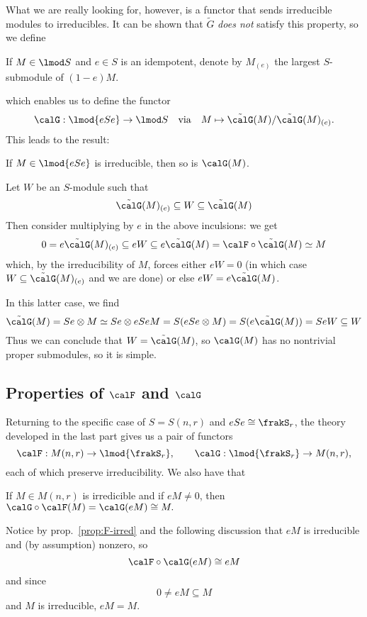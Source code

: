 \documentclass[12pt]{article}
\begin{document}
What we are really looking for, however, is a functor that sends irreducible modules to irreducibles. It can be shown that $\tilde G$ 
\textit{does not} satisfy this property, so we define 
\begin{defn}
	If $M\in\lmod S$ and $e\in S$ is an idempotent, denote by $M_{(e)}$ the largest $S$-submodule of $(1-e)M$.
\end{defn}
\noindent which enables us to define the functor 
\[\calG:\lmod{eSe}\to \lmod S\quad\text{via}\quad M\mapsto \tilde\calG(M)/\tilde\calG(M)_{(e)}.\]
This leads to the result:
\begin{prop}
	If $M\in \lmod{eSe}$ is irreducible, then so is $\calG(M)$.
\end{prop}
\begin{prf}
	Let $W$ be an $S$-module such that 
	\[\tilde\calG(M)_{(e)}\subseteq W\subseteq \tilde\calG(M)\]
	Then consider multiplying by $e$ in the above inculsions:
	we get
	\[0=e\tilde\calG(M)_{(e)}\subseteq eW\subseteq e\tilde \calG(M)=\calF\circ\tilde\calG(M)\simeq M\]
	which, by the irreducibility of $M$, forces either $eW=0$ (in which case $W\subseteq\tilde\calG(M)_{(e)}$ and we are done)
	or else $eW=e\tilde\calG(M)$.

	In this latter case, we find 
	\[\tilde\calG(M)= Se\otimes M\simeq Se\otimes eSeM=S(eSe\otimes M)=S(e\tilde\calG(M))=SeW\subseteq W\]
	Thus we can conclude that $W=\tilde\calG(M)$, so $\calG(M)$ has no nontrivial proper submodules, so it is simple.
\end{prf}

\subsection{Properties of \texorpdfstring{$\calF$ and $\calG$}{F and G}}
Returning to the specific case of $S=S(n,r)$ and $eSe\cong\frakS_r$, the theory developed in the last part
gives us a pair of functors
\[\calF:M(n,r)\to \lmod{\frakS_r},\qquad \calG:\lmod{\frakS_r}\to M(n,r),\]
each of which preserve irreducibility. We also have that
\begin{prop}
	If $M\in M(n,r)$ is irredicible and if $eM\ne 0$, then $\calG\circ\calF(M)=\calG(eM)\cong M.$
\end{prop}
\begin{prf}
	Notice by prop.~\ref{prop:F-irred} and the following discussion that $eM$ is irreducible and (by assumption) nonzero, so
	\[\calF\circ\calG(eM)\cong eM\]
	and since 
	\[0\ne eM\subseteq M\]
	and $M$ is irreducible, $eM=M$.
\end{prf}
\end{document}
